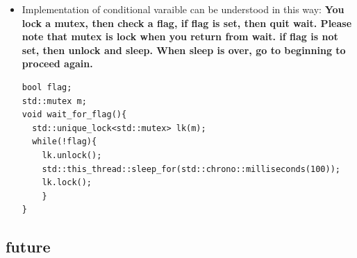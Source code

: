 \documentclass[a4paper,11pt,twoside]{book}
\begin{document}
\begin{itemize}
\begin{lstlisting}[frame=single, language=c++]
void waits(int idx) {
	std::unique_lock<std::mutex> lk(cv_m);
	if(cv.wait_for(lk, idx*100ms, []{return i == 1;})) 
		std::cerr << "Thread " << idx << " finished waiting. i == " << i << '\n';
	else
		std::cerr << "Thread " << idx << " timed out. i == " << i << '\n';
}

void signals() {
	std::this_thread::sleep_for(120ms);
	std::cerr << "Notifying...\n";
	cv.notify_all();
	std::this_thread::sleep_for(100ms); {
		std::lock_guard<std::mutex> lk(cv_m);
		i = 1;
	}
	std::cerr << "Notifying again...\n";
	cv.notify_all();
}

int main() {
	std::thread t1(waits, 1), t2(waits, 2), t3(waits, 3), t4(signals);
	t1.join(); t2.join(); t3.join(); t4.join();
}

\end{lstlisting}

\begin{lstlisting}
Thread 1 timed out. i == 0
Notifying...
Thread 2 timed out. i == 0
Notifying again...
Thread 3 finished waiting. i == 1
\end{lstlisting}

    \item Implementation of conditional varaible can be understood in this way: \textbf{You lock a mutex, then check a flag, if flag is set, then quit wait. Please note that mutex is lock when you return from wait.  if flag is not set, then unlock and sleep. When sleep is over, go to beginning to proceed again.} 
\begin{lstlisting}[]
bool flag;
std::mutex m;
void wait_for_flag(){
  std::unique_lock<std::mutex> lk(m);
  while(!flag){
    lk.unlock();
    std::this_thread::sleep_for(std::chrono::milliseconds(100));
    lk.lock();
    }
}
\end{lstlisting}

\end{itemize}

\subsection{future}
\end{document}
